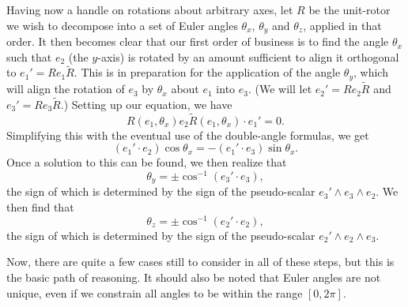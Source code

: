 \documentclass[12pt]{article}
\begin{document}
Having now a handle on rotations about arbitrary axes, let $R$ be the unit-rotor we wish to decompose
into a set of Euler angles $\theta_x$, $\theta_y$ and $\theta_z$, applied in that order.  It then becomes
clear that our first order of business is to find the angle $\theta_x$ such that $e_2$ (the $y$-axis) is
rotated by an amount sufficient to align it orthogonal to $e_1'=Re_1\tilde{R}$.  This is in preparation for the application
of the angle $\theta_y$, which will align the rotation of $e_3$ by $\theta_x$ about $e_1$ into $e_3$.
(We will let $e_2'=Re_2\tilde{R}$ and $e_3'=Re_3\tilde{R}$.)
Setting up our equation, we have
\begin{equation*}
R(e_1,\theta_x)e_2\tilde{R}(e_1,\theta_x)\cdot e_1' = 0.
\end{equation*}
Simplifying this with the eventual use of the double-angle formulas, we get
\begin{equation*}
(e_1'\cdot e_2)\cos\theta_x = -(e_1'\cdot e_3)\sin\theta_x.
\end{equation*}
Once a solution to this can be found, we then realize that
\begin{equation*}
\theta_y = \pm\cos^{-1}(e_3'\cdot e_3),
\end{equation*}
the sign of which is determined by the sign of the pseudo-scalar $e_3'\wedge e_3\wedge e_2$.
We then find that
\begin{equation*}
\theta_z = \pm\cos^{-1}(e_2'\cdot e_2),
\end{equation*}
the sign of which is determined by the sign of the pseudo-scalar $e_2'\wedge e_2\wedge e_3$.

Now, there are quite a few cases still to consider in all of these steps, but this is the basic path of reasoning.
It should also be noted that Euler angles are not unique, even if we constrain all angles to be within
the range $[0,2\pi]$.
\end{document}
